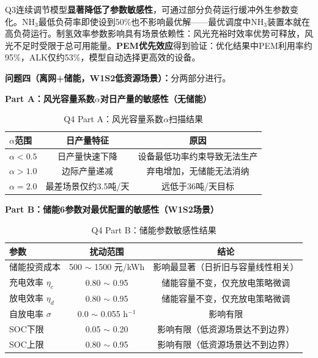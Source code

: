 \documentclass[zihao=-4,a4paper]{ctexart} %
\begin{document}
	Q3连续调节模型\textbf{显著降低了参数敏感性}，可通过部分负荷运行缓冲外生参数变化。NH$_3$最低负荷率即使设到50\%也不影响最优解——最优调度中NH$_3$装置本就在高负荷运行。制氢效率参数影响具有场景依赖性：风光充裕时效率优势可释放，风光不足时受限于总可用能量。\textbf{PEM优先效应}得到验证：优化结果中PEM利用率约95\%，ALK仅约53\%，模型自动选择更高效的设备。
	
	\textbf{问题四（离网+储能，W1S2低资源场景）：}分两部分进行。
	
	\textbf{Part A：风光容量系数$\alpha$对日产量的敏感性（无储能）}
	
	\begin{table}[ht]
		\centering
		\small
		\caption{Q4 Part A：风光容量系数$\alpha$扫描结果}
		\label{tab:q6_q4a}
		\begin{tabular}{lcc}
			\toprule
			$\alpha$范围 & 日产量特征 & 原因 \\
			\midrule
			$\alpha < 0.5$ & 日产量快速下降 & 设备最低功率约束导致无法生产 \\
			$\alpha > 1.0$ & 边际产量递减 & 弃电增加，无储能无法消纳 \\
			$\alpha = 2.0$ & 最差场景仅约3.5吨/天 & 远低于36吨/天目标 \\
			\bottomrule
		\end{tabular}
	\end{table}
	
	\textbf{Part B：储能6参数对最优配置的敏感性（W1S2场景）}
	
	\begin{table}[ht]
		\centering
		\small
		\caption{Q4 Part B：储能参数敏感性结果}
		\label{tab:q6_q4b}
		\begin{tabular}{lcc}
			\toprule
			参数 & 扰动范围 & 结论 \\
			\midrule
			储能投资成本 & 500 $\sim$ 1500 元/kWh & 影响最显著（日折旧与容量线性相关） \\
			充电效率 $\eta_c$ & 0.80 $\sim$ 0.95 & 储能容量不变，仅充放电策略微调 \\
			放电效率 $\eta_d$ & 0.80 $\sim$ 0.95 & 储能容量不变，仅充放电策略微调 \\
			自放电率 $\sigma$ & 0.0 $\sim$ 0.055 h$^{-1}$ & 影响有限 \\
			SOC下限 & 0.05 $\sim$ 0.20 & 影响有限（低资源场景达不到边界） \\
			SOC上限 & 0.80 $\sim$ 0.95 & 影响有限（低资源场景达不到边界） \\
			\bottomrule
		\end{tabular}
	\end{table}
	
\end{document}
